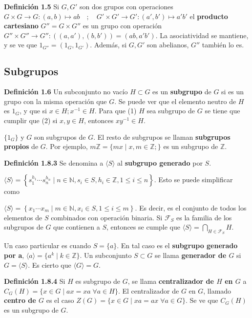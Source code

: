\documentclass[a4paper, 11pt]{extarticle}
\newcommand{\defi}[1]{\textcolor{azul}{\textbf{Definición #1}}}
\begin{document}
\defi{1.5} Si \(G,G'\) son dos grupos con operaciones
\(G \times G \rightarrow G: (a,b) \mapsto ab \quad;\quad G' \times G' \rightarrow G': (a', b') \mapsto a'b'\)
 el \textbf{producto cartesiano} \(G'' = G \times G''\) es un grupo con operación 
\(G'' \times G'' \rightarrow G'': ((a, a'), (b, b')) = (ab, a'b')\). La asociatividad se mantiene, 
y se ve que \(1_{G''} = (1_G, 1_{G'})\).
Además, si \(G, G'\) son abelianos, \(G''\) también lo es.

\subsection{Subgrupos}
\label{sec:org88c801f}
\defi{1.6} Un subconjunto no vacío \(H \subset G\) es un \textbf{subgrupo} de \(G\) si es un grupo con la misma operación que \(G\). 
Se puede ver que el elemento neutro de \(H\) es \(1_G\), y que si \(x \in H;
x^{-1} \in H\). Para que (1) \(H\) sea subgrupo de \(G\) se tiene que cumplir que
(2) si \(x,y \in H\), entonces \(x y^{-1} \in H\).

\(\{ 1_G \}\) y \(G\) son subgrupos de \(G\). El resto de subgrupos se
llaman \textbf{subgrupos propios} de \(G\). Por ejemplo, \(m \mathbb{Z} = \{ mx \;|\;
x,m \in \mathbb{Z}; 
\}\) es un subgrupo de \(\mathbb{Z}\). 

\defi{1.8.3} Se denomina a \(\langle S \rangle\) al \textbf{subgrupo generado} por \(S\). 


\(\langle S \rangle  = \left\{ s_1^{h_1} \cdots s_n^{h_n} \;|\; n \in \mathbb{N} , s_i \in S, h_i \in \mathbb{Z}
 , 1 \le i \le n
 \right\}\). Esto se puede simplificar como


\(\langle S \rangle  = \left\{ x_1 \cdots x_m \;|\; m \in \mathbb{N} , x_i \in S,  1 \le i \le m
 \right\}\). Es decir, es el conjunto de todos 
 los elementos de \(S\) combinados con operación binaria. Si \(\mathcal{F}_S\) es la
familia de los subgrupos de \(G\) que contienen a \(S\), entonces se cumple
que \(\langle S \rangle = \bigcap_{H \in \mathcal{F}_S}^{} H\).

Un caso particular es cuando \(S = \{ a \}\). En tal caso es el \textbf{subgrupo
generado por a}, \(\langle a \rangle = \{ a^k \;|\; k \in \mathbb{Z}\}\). Un subconjunto \(S \subset G\) se llama \textbf{generador de \(G\)} si \(G = \langle S \rangle\). Es cierto que
\(\langle G \rangle = G\).

\defi{1.8.4} Si \(H\) es subgrupo de \(G\), se llama \textbf{centralizador de \(H\) en \(G\)} a \(C_G(H) = \{ x \in G \;|\; ax=xa \; \forall a \in H \}\).
El
centralizador de \(G\) en \(G\), llamado \textbf{centro de \(G\)} es el caso \(Z(G) = \{ x \in G \;|\; xa = ax \; \forall a \in G \}\). Se ve que \(C_G(H)\) es un
subgrupo de \(G\).
\end{document}
